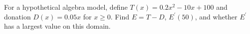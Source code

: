For a hypothetical algebra model, define $T(x)=0.2x^2-10x+100$ and donation $D(x)=0.05x$ for $x\ge0$. Find $E=T-D$, $E^\prime(50)$, and whether $E^\prime$ has a largest value on this domain.
